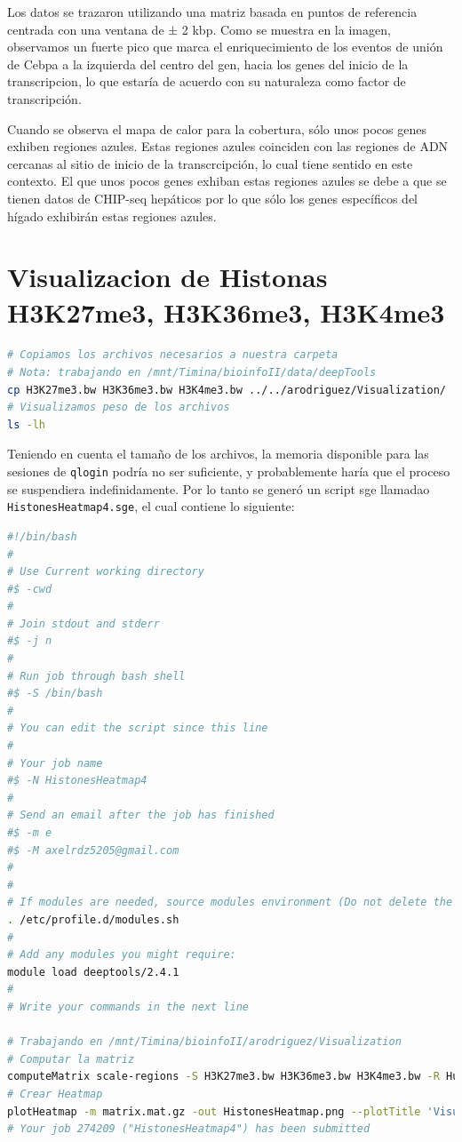 \documentclass[
]{article}
\newcommand{\passthrough}[1]{#1}
\begin{document}
Los datos se trazaron utilizando una matriz basada en puntos de
referencia centrada con una ventana de ± 2 kbp. Como se muestra en la
imagen, observamos un fuerte pico que marca el enriquecimiento de los
eventos de unión de Cebpa a la izquierda del centro del gen, hacia los
genes del inicio de la transcripcion, lo que estaría de acuerdo con su
naturaleza como factor de transcripción.

Cuando se observa el mapa de calor para la cobertura, sólo unos pocos
genes exhiben regiones azules. Estas regiones azules coinciden con las
regiones de ADN cercanas al sitio de inicio de la transcrcipción, lo
cual tiene sentido en este contexto. El que unos pocos genes exhiban
estas regiones azules se debe a que se tienen datos de CHIP-seq
hepáticos por lo que sólo los genes específicos del hígado exhibirán
estas regiones azules.

\hypertarget{visualizacion-de-histonas-h3k27me3-h3k36me3-h3k4me3}{%
\section{Visualizacion de Histonas H3K27me3, H3K36me3,
H3K4me3}\label{visualizacion-de-histonas-h3k27me3-h3k36me3-h3k4me3}}

\begin{lstlisting}[language=bash]
# Copiamos los archivos necesarios a nuestra carpeta
# Nota: trabajando en /mnt/Timina/bioinfoII/data/deepTools
cp H3K27me3.bw H3K36me3.bw H3K4me3.bw ../../arodriguez/Visualization/
# Visualizamos peso de los archivos
ls -lh
\end{lstlisting}

Teniendo en cuenta el tamaño de los archivos, la memoria disponible para
las sesiones de \passthrough{\lstinline!qlogin!} podría no ser
suficiente, y probablemente haría que el proceso se suspendiera
indefinidamente. Por lo tanto se generó un script sge llamadao
\passthrough{\lstinline!HistonesHeatmap4.sge!}, el cual contiene lo
siguiente:

\begin{lstlisting}[language=bash]
#!/bin/bash
#
# Use Current working directory
#$ -cwd
#
# Join stdout and stderr
#$ -j n
#
# Run job through bash shell
#$ -S /bin/bash
#
# You can edit the script since this line
#
# Your job name
#$ -N HistonesHeatmap4
#
# Send an email after the job has finished
#$ -m e
#$ -M axelrdz5205@gmail.com
#
#
# If modules are needed, source modules environment (Do not delete the next line):
. /etc/profile.d/modules.sh
#
# Add any modules you might require:
module load deeptools/2.4.1
#
# Write your commands in the next line

# Trabajando en /mnt/Timina/bioinfoII/arodriguez/Visualization
# Computar la matriz
computeMatrix scale-regions -S H3K27me3.bw H3K36me3.bw H3K4me3.bw -R Human38_genesGencodev39.bed --beforeRegionStartLength 1000 --regionBodyLength 1000 --afterRegionStartLength 1000 --skipZeros -o matrix.mat.gz
# Crear Heatmap
plotHeatmap -m matrix.mat.gz -out HistonesHeatmap.png --plotTitle 'Visualization of Human H3K27me3, H3K36me3, H3K4me3 ChIP data'
# Your job 274209 ("HistonesHeatmap4") has been submitted
\end{lstlisting}
\end{document}
